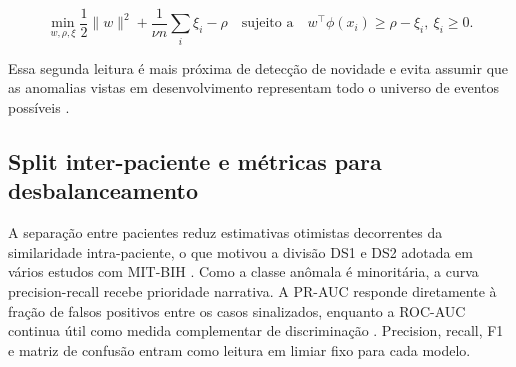 \[
\min_{w,\rho,\xi}\frac{1}{2}\|w\|^2+\frac{1}{\nu n}\sum_i \xi_i-\rho
\quad
\text{sujeito a}
\quad
w^\top\phi(x_i)\geq\rho-\xi_i,\ \xi_i\geq 0.
\]

Essa segunda leitura é mais próxima de detecção de novidade e evita assumir que
as anomalias vistas em desenvolvimento representam todo o universo de eventos
possíveis \citep{pimentel2014novelty}.

\subsection{Split inter-paciente e métricas para desbalanceamento}

A separação entre pacientes reduz estimativas otimistas decorrentes da
similaridade intra-paciente, o que motivou a divisão DS1 e DS2 adotada em
vários estudos com MIT-BIH \citep{mousavi2019inter}. Como a classe anômala é
minoritária, a curva precision-recall recebe prioridade narrativa. A PR-AUC
responde diretamente à fração de falsos positivos entre os casos sinalizados,
enquanto a ROC-AUC continua útil como medida complementar de discriminação
\citep{davis2006prroc}. Precision, recall, F1 e matriz de confusão entram como
leitura em limiar fixo para cada modelo.

